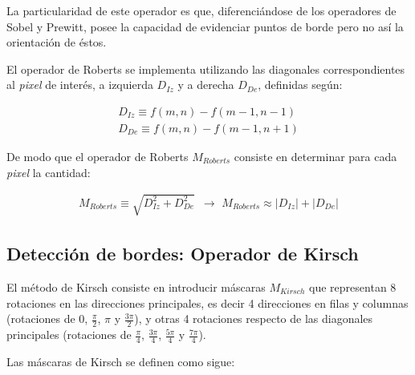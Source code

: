 La particularidad de este operador es que, diferenci\'andose de los operadores de Sobel y Prewitt, posee la capacidad de evidenciar puntos de
borde pero no as\'i la orientaci\'on de \'estos.

El operador de Roberts se implementa utilizando las diagonales correspondientes al \textit{pixel} de inter\'es, a izquierda $D_{Iz}$ y 
a derecha $D_{De}$, definidas seg\'un:

\begin{eqnarray}
	D_{Iz} \equiv f(m, n) - f(m-1, n-1) \\ \nonumber 
	D_{De} \equiv f(m, n) - f(m-1, n+1)  
\label{EqLXXXI}
\end{eqnarray}

De modo que el operador de Roberts $M_{Roberts}$ consiste en determinar para cada \textit{pixel} la cantidad:

\begin{eqnarray}
	M_{Roberts} \equiv \sqrt{D_{Iz}^2 + D_{De}^2} \, \, \, \rightarrow \, \, 
	M_{Roberts} \approx \lvert D_{Iz} \rvert + \lvert D_{De} \rvert
\label{EqLXXXII}
\end{eqnarray}


\subsection{Detecci\'on de bordes: Operador de Kirsch}
\label{CapV_5}

El m\'etodo de Kirsch consiste en introducir m\'ascaras $M_{Kirsch}$ que representan 8 rotaciones en las direcciones principales, es decir
4 direcciones en filas y columnas (rotaciones de $0$, $\frac{\pi}{2}$, $\pi$ y $\frac{3 \pi}{2}$), y otras 4 rotaciones respecto de las 
diagonales principales (rotaciones de $\frac{\pi}{4}$, $\frac{3 \pi}{4}$, $\frac{5 \pi}{4}$ y $\frac{7 \pi}{4}$).

Las m\'ascaras de Kirsch se definen como sigue:

\footnotesize


